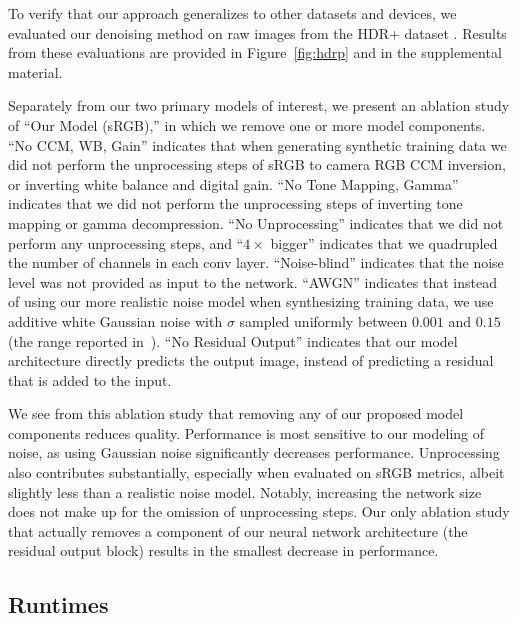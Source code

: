 \documentclass[10pt,twocolumn,letterpaper]{article}
\begin{document}
To verify that our approach generalizes to other datasets and devices, we evaluated our denoising method on raw images from the HDR+ dataset \cite{hasinoff2016burst}. Results from these evaluations are provided in Figure~\ref{fig:hdrp} and in the supplemental material.

Separately from our two primary models of interest, we present an ablation study of ``Our Model (sRGB),'' in which we remove one or more model components.
``No CCM, WB, Gain'' indicates that when generating synthetic training data we did not perform the unprocessing steps of sRGB to camera RGB CCM inversion, or inverting white balance and digital gain. ``No Tone Mapping, Gamma'' indicates that we did not perform the unprocessing steps of inverting tone mapping or gamma decompression. ``No Unprocessing'' indicates that we did not perform any unprocessing steps, and ``$4\times$ bigger'' indicates that we quadrupled the number of channels in each conv layer. ``Noise-blind'' indicates that the noise level was not provided as input to the network. ``AWGN'' indicates that instead of using our more realistic noise model when synthesizing training data, we use additive white Gaussian noise with $\sigma$ sampled uniformly between $0.001$ and $0.15$ (the range reported in~\cite{plotz2017cvpr}).
``No Residual Output'' indicates that our model architecture directly predicts the output image, instead of predicting a residual that is added to the input.

We see from this ablation study that removing any of our proposed model components reduces quality. Performance is most sensitive to our modeling of noise, as using Gaussian noise significantly decreases performance.
Unprocessing also contributes substantially, especially when evaluated on sRGB metrics, albeit slightly less than a realistic noise model. 
Notably, increasing the network size does not make up for the omission of unprocessing steps.
Our only ablation study that actually removes a component of our neural network architecture (the residual output block) results in the smallest decrease in performance.

\subsection{Runtimes}
\label{sec:runtimes}
\end{document}
